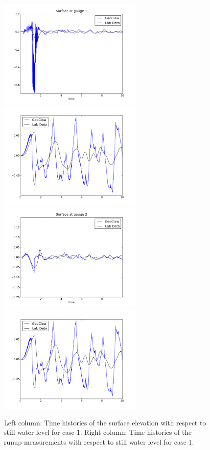 \begin{figure}[ht]
\hfil\includegraphics[width=2.8in]{bp12/case1wavegauge1.png}\hfil
\hfil\includegraphics[width=2.8in]{bp12/case1runupgauge2.png}\hfil
\vskip 5pt
\hfil\includegraphics[width=2.8in]{bp12/case1wavegauge2.png}\hfil
\hfil\includegraphics[width=2.8in]{bp12/case1runupgauge2.png}\hfil
\caption{\label{fig:bp8gauges1}
Left column: Time histories of the surface elevation with respect to still
water level for case 1.
Right column: Time histories of the runup measurements with respect
to still water level for case 1.
  }
\end{figure}



